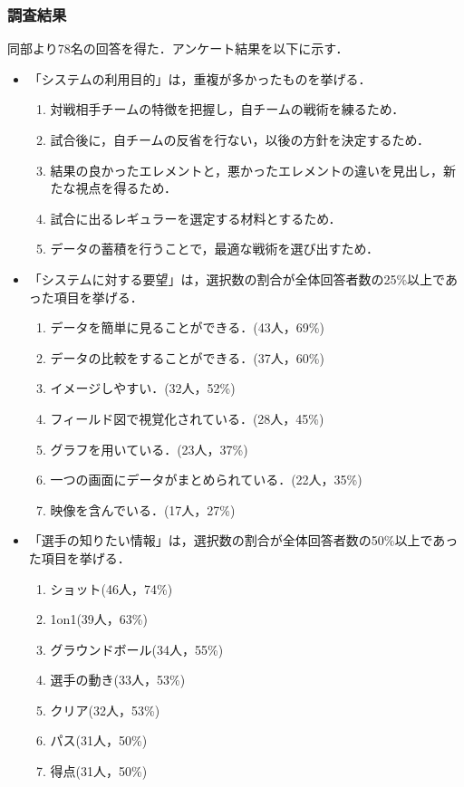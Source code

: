 \documentclass[sotsuron]{kuee}
\begin{document}
			\subsubsection{調査結果}
				同部より78名の回答を得た．アンケート結果を以下に示す．
				\begin{itemize}
					\item 「システムの利用目的」は，重複が多かったものを挙げる．
						\begin{enumerate}
						\item 対戦相手チームの特徴を把握し，自チームの戦術を練るため．
						\item 試合後に，自チームの反省を行ない，以後の方針を決定するため．
						\item 結果の良かったエレメントと，悪かったエレメントの違いを見出し，新たな視点を得るため．
						\item 試合に出るレギュラーを選定する材料とするため．
						\item データの蓄積を行うことで，最適な戦術を選び出すため．
						\end{enumerate}
					\item 「システムに対する要望」は，選択数の割合が全体回答者数の25\%以上であった項目を挙げる．
						\begin{enumerate}
						\item データを簡単に見ることができる．(43人，69\%)
						\item データの比較をすることができる．(37人，60\%)
						\item イメージしやすい．(32人，52\%)
						\item フィールド図で視覚化されている．(28人，45\%)
						\item グラフを用いている．(23人，37\%)
						\item 一つの画面にデータがまとめられている．(22人，35\%)
						\item 映像を含んでいる．(17人，27\%)
						\end{enumerate}
					\item 「選手の知りたい情報」は，選択数の割合が全体回答者数の50\%以上であった項目を挙げる．
						\begin{enumerate}
						\item ショット(46人，74\%)
						\item 1on1(39人，63\%)
						\item グラウンドボール(34人，55\%)
						\item 選手の動き(33人，53\%)
						\item クリア(32人，53\%)
						\item パス(31人，50\%)
						\item 得点(31人，50\%)
						\end{enumerate}
				\end{itemize}
\end{document}
